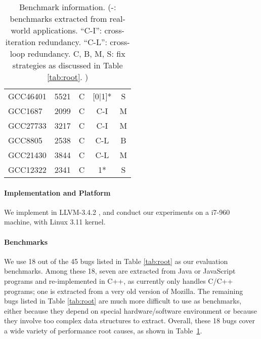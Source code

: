 \begin{table}
\begin{tabular}{lcccc}
   GCC46401              & 5521            & C                      &  [0$|$1]*    & S   \\
   GCC1687               & 2099            & C                      &  C-I         & M \\
   GCC27733              & 3217            & C                      &  C-I         & M \\
   GCC8805               & 2538            & C                      &  C-L         & B\\
   GCC21430              & 3844            & C                      &  C-L         & M \\
   GCC12322              & 2341            & C                      &  1*          & S\\
\bottomrule
   \end{tabular}
  \caption{Benchmark information.
  (-: benchmarks extracted from real-world applications.
  ``C-I'': cross-iteration redundancy.
  ``C-L'': cross-loop redundancy.
  C, B, M, S: fix strategies as discussed in
  Table \ref{tab:root}.
  ) 
 }
  \label{tab:benchmarks}
\end{table}

\paragraph{Implementation and Platform}
We implement \Tool in LLVM-3.4.2 \cite{llvm}, and conduct our
experiments on a i7-960 machine, with Linux 3.11 kernel. 

\paragraph{Benchmarks}
We use 18 out of the 45 bugs listed in Table \ref{tab:root} as our 
evaluation benchmarks. Among these 18, seven are extracted from Java or JavaScript
programs and re-implemented in C++, as \Tool currently only handles C/C++
programs; one is extracted from a very old version of Mozilla.
The remaining bugs listed in Table \ref{tab:root} are much more difficult to
use as benchmarks, 
either because they depend on special hardware/software environment
or because they involve too complex data structures to extract. 
Overall, these 18 bugs cover a wide variety of performance root causes, as 
shown in Table~\ref{tab:benchmarks}. 

